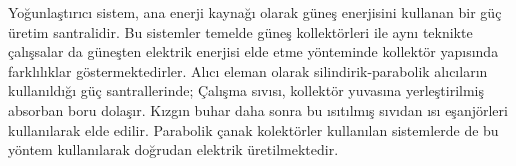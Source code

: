 Yoğunlaştırıcı sistem, ana enerji kaynağı olarak güneş enerjisini kullanan bir güç üretim santralidir. Bu sistemler temelde güneş kollektörleri ile aynı teknikte çalışsalar da güneşten elektrik enerjisi elde etme yönteminde kollektör yapısında farklılıklar göstermektedirler. Alıcı eleman olarak silindirik-parabolik alıcıların kullanıldığı güç santrallerinde; Çalışma sıvısı, kollektör yuvasına yerleştirilmiş absorban boru dolaşır. Kızgın buhar daha sonra bu ısıtılmış sıvıdan ısı eşanjörleri kullanılarak elde edilir. Parabolik çanak kolektörler kullanılan sistemlerde de bu yöntem kullanılarak doğrudan elektrik üretilmektedir.
\begin{figure}[htbp]
\centering



\begin{tikzpicture}[x=0.75pt,y=0.75pt,yscale=-1,xscale=1]


\end{tikzpicture}
\end{figure}
